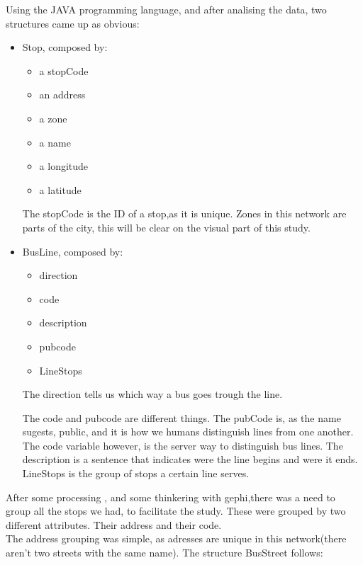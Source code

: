 \documentclass[12pt]{report}
\begin{document}
Using the JAVA programming language, and after analising the data, two structures came up as obvious:
\begin{itemize}
\item Stop, composed by:
	\begin{itemize}
	\item a stopCode
	\item an address
	\item a zone
	\item a name
	\item a longitude
	\item a latitude
	\end{itemize}
	The stopCode is the ID of a stop,as it is unique.
	Zones in this network are parts of the city, this will be clear on the visual part 		of this study.
	
\item BusLine, composed by:
	\begin{itemize}
	\item direction
	\item code
	\item description
	\item pubcode
	\item LineStops
	\end{itemize}
	

	The direction tells us which way a bus goes trough the line.

	The code and pubcode are different things. The pubCode is, as the name sugests, 			public, and it is how we humans distinguish lines from one another. 
	The code variable however, is the server way to distinguish bus lines.
	The description is a sentence that indicates were the line begins and were it ends.
	LineStops is the group of stops a certain line serves.
	
\end{itemize}
	After some processing , and some thinkering with gephi,there was a need to group all the stops we had, to facilitate the study. These were grouped by two different attributes. Their address and their code. \\
	
The address grouping was simple, as adresses are unique in this network(there aren't two streets with the same name). The structure BusStreet follows:	
	
\end{document}
